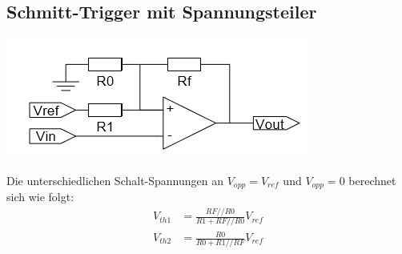 \subsection{Schmitt-Trigger mit Spannungsteiler}
\begin{minipage}{0.20\textwidth}
	\includegraphics[width=\linewidth,keepaspectratio=true]{./Images/screenshot002}
\end{minipage}%
\begin{minipage}{0.30\textwidth}
	Die unterschiedlichen Schalt-Spannungen an $V_{opp}=V_{ref}$ und $V_{opp}=0$ berechnet sich wie folgt:
	\begin{align*}
		V_{th1} &= \frac{RF//R0}{R1 + RF//R0}V_{ref} \\
		V_{th2} &= \frac{R0}{R0 + R1//RF}V_{ref}
	\end{align*}
\end{minipage}\\


